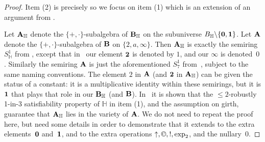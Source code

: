 \documentclass[eqnor,reqno]{amsart}
\theoremstyle{plain}
\theoremstyle{definition}
\newcommand{\cc}{\mathbin{\textup{\copyright}}}
\begin{document}
\begin{proof}
Item (2) is precisely \cite[Lemma 3.3]{JRZ} so we focus on item (1) which is an extension of an argument from \cite{JRZ}.  

Let ${\bf A}_\mathbb{H}$ denote the $\{+,\cdot\}$-subalgebra of ${\bf B}_\mathbb{H}$ on the subuniverse $B_\mathbb{H}\backslash\{{\bf 0},{\bf 1}\}$.  
Let ${\bf A}$ denote the $\{+,\cdot\}$-subalgebra of ${\bf B}$ on $\{2,a,\infty\}$.  
Then ${\bf A}_\mathbb{H}$ is exactly the semiring $S_\mathbb{H}^1$ from \cite{JRZ}, except that in~\cite{JRZ} our element ${\bf 2}$ is denoted by $1$, and our $\infty$ is denoted~$0$.  
Similarly the semiring ${\bf A}$ is just the aforementioned $S_7^1$ from~\cite{JRZ}, subject to the same naming conventions.  The element $2$ in ${\bf A}$ (and ${\bf 2}$ in ${\bf A}_\mathbb{H}$) can be given the status of a constant: it is a multiplicative identity within these semirings, but it is ${\bf 1}$ that plays that role in our ${\bf B}_\mathbb{H}$ (and ${\bf B}$).  
In~\cite{JRZ} it is shown that the $\leq 2$-robustly 1-in-3 satisfiability property of $\mathbb{H}$ in item (1), and the assumption on girth, guarantee that ${\bf A}_\mathbb{H}$ lies in the variety of ${\bf A}$.  
We do not need to repeat the proof here, but need some details in order to demonstrate that it extends to the extra elements~${\bf 0}$ and~${\bf 1}$, and to the extra operations $\uparrow,\cc,!,\exp_2$, and the nullary~$0$.


\end{proof}
\end{document}
